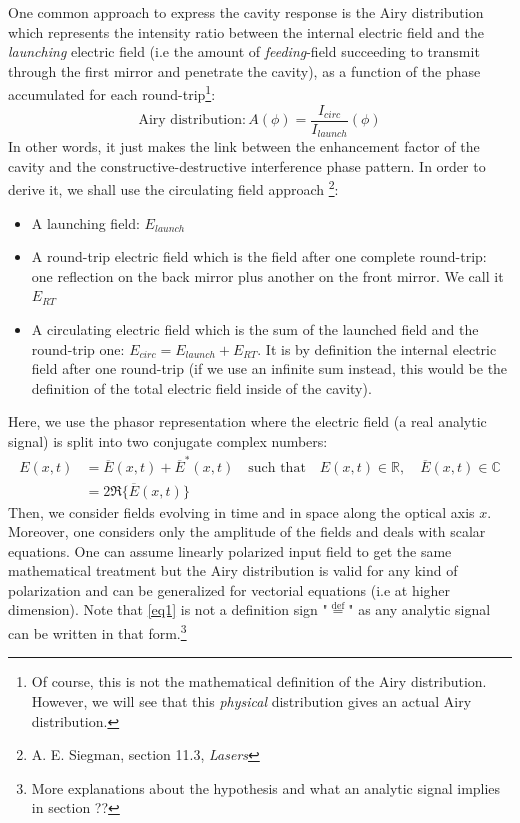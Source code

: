 \documentclass[11pt]{report}
\begin{document}
One common approach to express the cavity response is the Airy distribution which represents the intensity ratio between the internal electric field and the \textit{launching} electric field (i.e the amount of \textit{feeding}-field succeeding to transmit through the first mirror and penetrate the cavity), as a function of the phase accumulated for each round-trip\footnote{Of course, this is not the mathematical definition of the Airy distribution. However, we will see that this \textit{physical} distribution gives an actual Airy distribution.}:
\begin{equation}
\label{eqairy}
\textrm{Airy distribution} : A(\phi) = \frac{I_{circ}}{I_{launch}}(\phi)
\end{equation} 
In other words, it just makes the link between the enhancement factor of the cavity and the constructive-destructive interference phase pattern. In order to derive it, we shall use the circulating field approach \footnote{A. E. Siegman, section 11.3, \textit{Lasers}}:
\begin{itemize}
	\item A launching field: $ E_{launch} $
	\item A round-trip electric field which is the field after one complete round-trip: one reflection on the back mirror plus another on the front mirror. We call it $ E_{RT}$
	\item A circulating electric field which is the sum of the launched field and the round-trip one: $ E_{circ} =  E_{launch} + E_{RT}$. It is by definition the internal electric field after one round-trip (if we use an infinite sum instead, this would be the definition of the total electric field inside of the cavity).
\end{itemize}

Here, we use the phasor representation where the electric field (a real analytic signal) is split into two conjugate complex numbers:
\begin{align} 
\label{eq1}
E(x, t) &= \overline{E}(x, t) + \overline{E}^*(x, t) \quad \textrm{such that} \quad E(x, t) \in \mathbb{R}, \quad \overline{E}(x, t) \in \mathbb{C} \\\label{eq2}
&= 2 \Re \{  \overline{E}(x, t) \} 
\end{align}
Then, we consider fields evolving in time and in space along the optical axis $ x$. Moreover, one considers only the amplitude of the fields and deals with scalar equations. One can assume linearly polarized input field to get the same mathematical treatment but the Airy distribution is valid for any kind of polarization and can be generalized for vectorial equations (i.e at higher dimension). Note that \eqref{eq1} is not a definition sign "$\stackrel{\text{def}}{=}$" as any analytic signal can be written in that form.\footnote{More explanations about the hypothesis and what an analytic signal implies in section ??}
\end{document}
